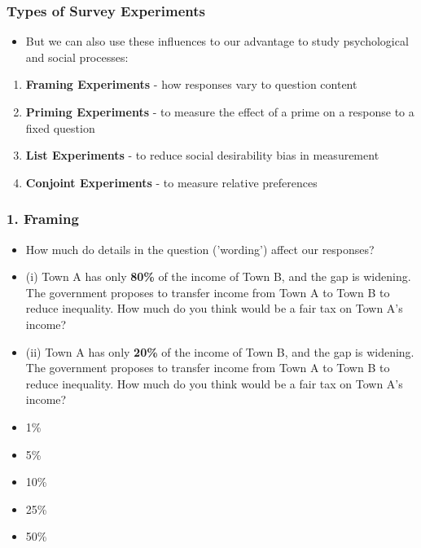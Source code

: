 \documentclass[xcolor=x11names,compress]{beamer}\usepackage[]{graphicx}\usepackage[]{color}
\renewcommand{\(}{\begin{columns}}
\renewcommand{\)}{\end{columns}}
\newcommand{\<}[1]{\begin{column}{#1}}
\renewcommand{\>}{\end{column}}
\begin{document}
\begin{frame}
\frametitle{Types of Survey Experiments}
\begin{itemize}
\item But we can also use these influences to our advantage to study psychological and social processes:
\pause
\end{itemize}
\begin{enumerate}
\item \textbf{Framing Experiments} - how responses vary to question content
\pause
\item \textbf{Priming Experiments} - to measure the effect of a prime on a response to a fixed question
\pause
\item \textbf{List Experiments} - to reduce social desirability bias in measurement
\pause
\item \textbf{Conjoint Experiments} - to measure relative preferences
\end{enumerate}
\end{frame}

\begin{frame}
\frametitle{1. Framing}
\begin{itemize}
\item How much do details in the question ('wording') affect our responses?
\pause
\item (i) Town A has only \textbf{80\%} of the income of Town B, and the gap is widening. The government proposes to transfer income from Town A to Town B to reduce inequality. How much do you think would be a fair tax on Town A's income?
\pause
\item (ii) Town A has only \textbf{20\%} of the income of Town B, and the gap is widening. The government proposes to transfer income from Town A to Town B to reduce inequality. How much do you think would be a fair tax on Town A's income?
\pause
\item 1\%
\item 5\%
\item 10\%
\item 25\%
\item 50\%
\end{itemize}
\end{frame}
\end{document}
